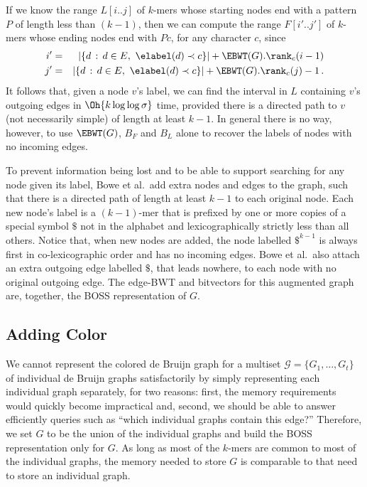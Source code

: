 \documentclass[doctor]{thesis}
\begin{document}
If we know the range \(L [i..j]\) of $k$-mers whose starting nodes end with a pattern $P$ of length less than \((k - 1)\), then we can compute the range \(F [i'..j']\) of $k$-mers whose ending nodes end with \(P c\), for any character $c$, since
\begin{eqnarray*}
    i' & = & |\{d\,:\,d \in E,\ \elabel (d) \prec c\}| + \EBWT (G).\rank_c (i - 1)\\ 
    j' & = & |\{d\,:\,d \in E,\ \elabel (d) \prec c\}| + \EBWT (G).\rank_c (j) - 1\,.
\end{eqnarray*}
It follows that, given a node $v$'s label, we can find the interval in $L$ containing $v$'s outgoing edges in $\Oh{k \log \log \sigma}$ time, provided there is a directed path to $v$ (not necessarily simple) of length at least \(k - 1\).  In general there is no way, however, to use \(\EBWT (G)\), $B_F$ and $B_L$ alone to recover the labels of nodes with no incoming edges.

To prevent information being lost and to be able to support searching for any node given its label, Bowe et al.\ add extra nodes and edges to the graph, such that there is a directed path of length at least \(k - 1\) to each original node.  Each new node's label is a \((k - 1)\)-mer that is prefixed by one or more copies of a special symbol $\$$ not in the alphabet and lexicographically strictly less than all others.  Notice that, when new nodes are added, the node labelled $\$^{k - 1}$ is always first in co-lexicographic order and has no incoming edges.  Bowe et al.\ also attach an extra outgoing edge labelled $\$$, that leads nowhere, to each node with no original outgoing edge.  The edge-BWT and bitvectors for this augmented graph are, together, the BOSS representation of $G$.

\subsection{Adding Color}
\label{subsec:color}

We cannot represent the colored de Bruijn graph for a multiset \(\mathcal{G} = \{G_1, \ldots, G_t\}\) of individual de Bruijn graphs satisfactorily by simply representing each individual graph separately, for two reasons: first, the memory requirements would quickly become impractical and, second, we should be able to answer efficiently queries such as ``which individual graphs contain this edge?''  Therefore, we set $G$ to be the union of the individual graphs and build the BOSS representation only for $G$.  As long as most of the $k$-mers are common to most of the individual graphs, the memory needed to store $G$ is comparable to that need to store an individual graph.
\end{document}

